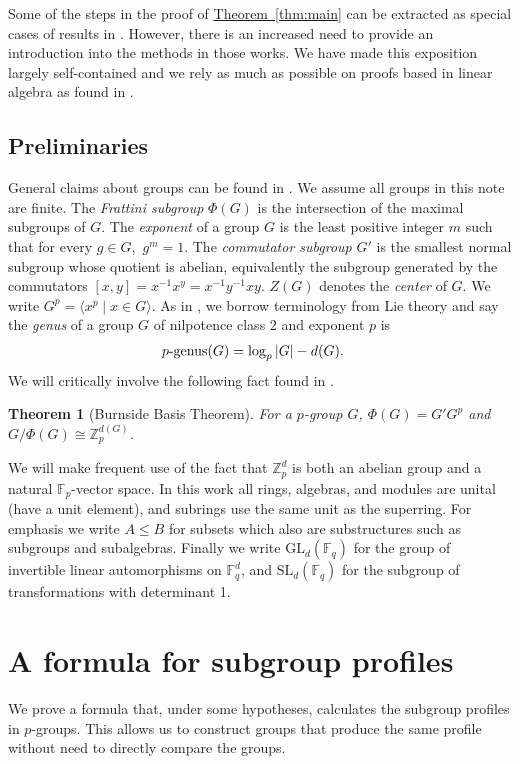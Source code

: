 \documentclass[11pt]{article}
\numberwithin{equation}{section}
\theoremstyle{definition}
\theoremstyle{plain}
\newcommand{\expref}[2]{\hyperref[#2]{#1~\ref{#2}}}
\numberwithin{equation}{section}
\theoremstyle{plain}       %
\newtheorem{thm}[equation]{Theorem}
\theoremstyle{remark}
\theoremstyle{definition}
\numberwithin{figure}{section}
\numberwithin{table}{section}
\newcommand{\bbF}{\mathbb{F}}  %
\begin{document}
Some of the steps in the proof of \expref{Theorem}{thm:main} 
can be extracted as
special cases of results in \cite{LW, BW:autotopism, BMW}. However, there is an
increased need to provide an introduction into the methods in those works.  We
have made this exposition largely self-contained and we rely as much as possible
on proofs based in linear algebra as found in \cite{JacII}.



\subsection*{Preliminaries}
General claims about groups can be found in \cite{Robinson}.  We assume all
groups in this note are finite.  The \emph{Frattini subgroup} $\Phi(G)$ is the
intersection of the maximal subgroups of $G$.  The \emph{exponent} of a group
$G$ is the least positive integer $m$ such that for every $g\in G$,\  $g^m=1$.
The \emph{commutator subgroup} $G'$ is the smallest normal subgroup whose
quotient is abelian, equivalently the subgroup generated by the commutators
$[x,y]=x^{-1}x^y=x^{-1}y^{-1}xy$. $Z(G)$ denotes the \emph{center} of $G$.  We
write $G^p=\langle x^p\mid x\in G\rangle$. As in \cite{BMW}, we borrow
terminology from Lie theory and say the \emph{genus} of a group $G$ of
nilpotence class $2$ and exponent $p$ is
\begin{align}\label{def:genus}
	\textnormal{$p$-genus}(G) & =\log_p |G| - d(G).
\end{align}
We will critically involve the following fact found in \cite[p. 140]{Robinson}.

\begin{thm}[Burnside Basis Theorem]
For a  $p$-group $G$, $\Phi(G)=G' G^p$ and $G/\Phi(G)\cong \mathbb{Z}_p^{d(G)}$.
\end{thm}


We will make frequent use of the fact that $\mathbb{Z}_p^d$ is both an abelian
group and a natural $\bbF_p$-vector space.  In this work all rings, algebras,
and modules are unital (have a unit element), and subrings use the same unit as
the superring.  For emphasis we write $A\leq B$ for subsets which also are
substructures such as subgroups and subalgebras.  Finally we write
$\mathrm{GL}_d(\bbF_q)$ for the group of invertible linear automorphisms on
$\bbF_q^d$, and $\mathrm{SL}_d(\bbF_q)$ for the subgroup of transformations with
determinant 1.



\section{A formula for subgroup profiles}
We prove a formula that, under some hypotheses, calculates the subgroup profiles
in $p$-groups. This allows us to construct groups that produce the same profile
without need to directly compare the groups.
\end{document}
